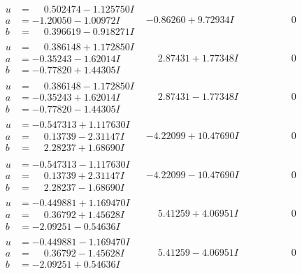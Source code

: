 \documentclass[1p]{elsarticle_modified}
\theoremstyle{definition}
\begin{document}
$$\begin{array}{c|c|c}
\begin{aligned}
u &= \phantom{-}0.502474 - 1.125750 I \\
a &= -1.20050 - 1.00972 I \\
b &= \phantom{-}0.396619 - 0.918271 I\end{aligned}
 & -0.86260 + 9.72934 I & \phantom{-0.000000 } 0 \\ \hline\begin{aligned}
u &= \phantom{-}0.386148 + 1.172850 I \\
a &= -0.35243 - 1.62014 I \\
b &= -0.77820 + 1.44305 I\end{aligned}
 & \phantom{-}2.87431 + 1.77348 I & \phantom{-0.000000 } 0 \\ \hline\begin{aligned}
u &= \phantom{-}0.386148 - 1.172850 I \\
a &= -0.35243 + 1.62014 I \\
b &= -0.77820 - 1.44305 I\end{aligned}
 & \phantom{-}2.87431 - 1.77348 I & \phantom{-0.000000 } 0 \\ \hline\begin{aligned}
u &= -0.547313 + 1.117630 I \\
a &= \phantom{-}0.13739 - 2.31147 I \\
b &= \phantom{-}2.28237 + 1.68690 I\end{aligned}
 & -4.22099 + 10.47690 I & \phantom{-0.000000 } 0 \\ \hline\begin{aligned}
u &= -0.547313 - 1.117630 I \\
a &= \phantom{-}0.13739 + 2.31147 I \\
b &= \phantom{-}2.28237 - 1.68690 I\end{aligned}
 & -4.22099 - 10.47690 I & \phantom{-0.000000 } 0 \\ \hline\begin{aligned}
u &= -0.449881 + 1.169470 I \\
a &= \phantom{-}0.36792 + 1.45628 I \\
b &= -2.09251 - 0.54636 I\end{aligned}
 & \phantom{-}5.41259 + 4.06951 I & \phantom{-0.000000 } 0 \\ \hline\begin{aligned}
u &= -0.449881 - 1.169470 I \\
a &= \phantom{-}0.36792 - 1.45628 I \\
b &= -2.09251 + 0.54636 I\end{aligned}
 & \phantom{-}5.41259 - 4.06951 I & \phantom{-0.000000 } 0 \\ \hline\begin{aligned}

\end{aligned}
\end{array}$$
\end{document}
